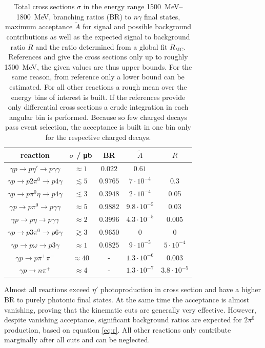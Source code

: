 \begin{table}[htbp]
	\centering
	\begin{tabular}{ccccc}
		\toprule
		reaction & $\sigma$ / \si{\micro\barn} & BR\cite{pdg} & $\tilde{A}$&$R$\\
		\hline
		$\gamma p\to p\eta'\to p\gamma\gamma$ &$\approx1$ \cite{etap_cs}& $0.022$ & $0.61$&\\
		$\gamma p\to p2\pi^0\to p4\gamma$ &$\lesssim5$ \cite{2pi0_cs}&$0.9765$& $7\cdot 10^{-4}$&0.3\\
		$\gamma p\to p\pi^0\eta\to p 4\gamma$ &$\lesssim3$ \cite{pi0eta_cs} &$0.3948$&$2\cdot 10^{-4}$&0.05\\
		\hline
		$\gamma p \to p\pi^0\to p\gamma\gamma$&$\approx 5$\cite{pi0_cs2}&$0.9882$&$9.8\cdot10^{-5}$&$0.03$\\
		$\gamma p \to p\eta\to p\gamma\gamma$&$\approx 2$ \cite{etap_cs}&$0.3996$&$4.3\cdot10^{-5}$&$0.005$\\
		$\gamma p \to p3\pi^0\to p6\gamma$&$\gtrsim 3$\cite{3pi0cs} &$0.9650$&0&0\\
		$\gamma p \to p\omega \to p3\gamma$&$\approx 1$ \cite{omegacs}&$0.0825$&$9\cdot10^{-5}$&$5\cdot10^{-4}$\\
		$\gamma p \to p\pi^+\pi^-$&$\approx40$ \cite{pipics}&-&$1.3\cdot 10^{-6}$&$0.003$\\
		$\gamma p \to n\pi^+$&$\approx 4$ \cite{npiplcs}&-&$1.3\cdot10^{-7}$&$3.8\cdot10^{-5}$\\
		\bottomrule 		
	\end{tabular}
\caption{Total cross sections $\sigma$ in the energy range \SIrange{1500}{1800}{\mega\eV}, branching ratios (BR) to $n\gamma$ final states, maximum acceptance $\tilde{A}$ for signal and possible background contributions as well as the expected signal to background ratio $R$ and the ratio determined from a global fit $R_\text{MC}$. References \cite{2pi0_cs} and \cite{pi0eta_cs} give the cross sections only up to roughly \SI{1500}{\mega\eV}, the given values are thus upper bounds. For the same reason, from reference \cite{3pi0cs} only a lower bound can be estimated. For all other reactions a rough mean over the energy bins of interest is built. If the references provide only differential cross sections a crude integration in each angular bin is performed. Because so few charged decays pass event selection, the acceptance is built in one bin only for the respective charged decays.}
\label{tab:plausmc}
\end{table}
\noindent Almost all reactions exceed $\eta'$ photoproduction in cross section and have a higher BR to purely photonic final states. At the same time the acceptance is almost vanishing, proving that the kinematic cuts are generally very effective. However, despite vanishing acceptance, significant background ratios are expected for $2\pi^0$ production, based on equation \eqref{eq:r}. All other reactions only contribute marginally after all cuts and can be neglected.  

